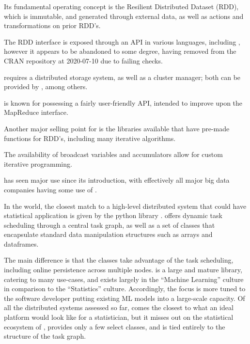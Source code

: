 Its fundamental operating concept is the Resilient Distributed Dataset
(RDD), which is immutable, and generated through external data, as well
as actions and transformations on prior RDD's.

The RDD interface is exposed through an API in various languages,
including \R{}, however it appears to be abandoned to some degree, having
removed from the CRAN repository at 2020-07-10 due to failing checks.

 requires a distributed storage system, as well as a cluster
manager; both can be provided by , among others.

 is known for possessing a fairly user-friendly API, intended to
improve upon the MapReduce interface.

Another major selling point for  is the libraries available that
have pre-made functions for RDD's, including many iterative algorithms.

The availability of broadcast variables and accumulators allow for
custom iterative programming.

 has seen major use since its introduction, with effectively all
major big data companies having some use of .

In the  world, the closest match to a high-level distributed
system that could have statistical application is given by the python
library \cite{rocklin2015dask}.  offers
dynamic task scheduling through a central task graph, as well as a set
of classes that encapsulate standard data manipulation structures such
as  arrays and  dataframes.

The main difference is that the  classes take advantage of
the task scheduling, including online persistence across multiple nodes.
 is a large and mature library, catering to many use-cases,
and exists largely in the  ``Machine Learning'' culture in
comparison to the \R{} ``Statistics'' culture. Accordingly, the focus is
more tuned to the  software developer putting existing ML models
into a large-scale capacity. Of all the distributed systems assessed so
far,  comes the closest to what an ideal platform would
look like for a statistician, but it misses out on the statistical
ecosystem of \R{}, provides only a few select classes, and is tied entirely
to the structure of the task graph.
